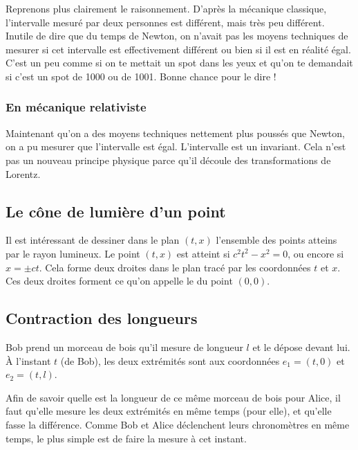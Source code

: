 Reprenons plus clairement le raisonnement. D'après la mécanique classique, l'intervalle mesuré par deux personnes est différent, mais très peu différent. Inutile de dire que du temps de Newton, on n'avait pas les moyens techniques de mesurer si cet intervalle est effectivement différent ou bien si il est en réalité égal. C'est un peu comme si on te mettait un spot dans les yeux et qu'on te demandait si c'est un spot de \unit{1000}{\watt} ou de \unit{1001}{\watt}. Bonne chance pour le dire !

\subsubsection{En mécanique relativiste}

 Maintenant qu'on a des moyens techniques nettement plus poussés que Newton, on a pu mesurer que l'intervalle est égal. L'intervalle est un invariant. Cela n'est pas un nouveau principe physique parce qu'il découle des transformations de Lorentz.


\subsection{Le cône de lumière d'un point}


Il est intéressant de dessiner dans le plan $(t,x)$ l'ensemble des points atteins par le rayon lumineux. Le point $(t,x)$ est atteint si $c^2t^2-x^2=0$, ou encore si $x=\pm ct$. Cela forme deux droites dans le plan tracé par les coordonnées $t$ et $x$. Ces deux droites forment ce qu'on appelle le  du point $(0,0)$.

\subsection{Contraction des longueurs}

Bob prend un morceau de bois qu'il mesure de longueur $l$ et le dépose devant lui. À l'instant $t$ (de Bob), les deux extrémités sont aux coordonnées $e_1=(t,0)$ et $e_2=(t,l)$. 

Afin de savoir quelle est la longueur de ce même morceau de bois pour Alice, il faut qu'elle mesure les deux extrémités en même temps (pour elle), et qu'elle fasse la différence. Comme Bob et Alice déclenchent leurs chronomètres en même temps, le plus simple est de faire la mesure à cet instant.

